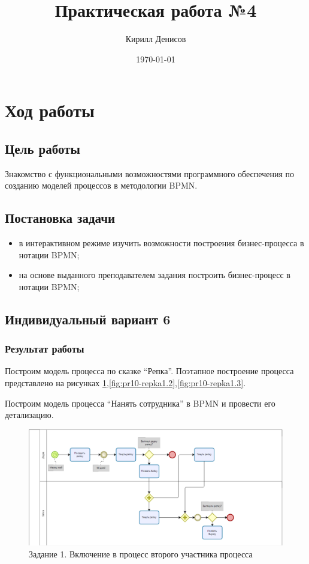 \documentclass[a4paper,14pt]{extarticle}
\author{Кирилл Денисов}
\title{Практическая работа №4}
\date{\today}
\newcommand{\pathToCommonFolder}{/home/denilai/Documents/repos/latex/Common}
\begin{document}
	\thispagestyle{empty}
	
	\newpage
	\newpage
\section{Ход работы}

\subsection*{Цель работы}
Знакомство с функциональными возможностями программного
обеспечения по созданию моделей процессов в методологии BPMN.

\subsection*{Постановка задачи}
\begin{itemize}
	\item в интерактивном режиме изучить возможности построения бизнес-процесса в нотации BPMN;
	\item на основе выданного преподавателем задания построить бизнес-процесс в нотации BPMN;
\end{itemize}



\subsection*{Индивидуальный вариант 6}

\subsubsection*{Результат работы}
\begin{problem}
	Построим модель процесса по сказке “Репка”. Поэтапное построение процесса представлено на рисунках \ref{fig:pr10-repka1.1},\ref{fig:pr10-repka1.2},\ref{fig:pr10-repka1.3}.
\end{problem}

\begin{problem}
	Построим модель процесса “Нанять сотрудника” в BPMN и провести его детализацию.
\end{problem}
	
	\begin{figure}[htpb]
		\centering
		\includegraphics[width=0.8\linewidth]{images/pr10-repka1.1}
		\caption{Задание 1. Включение в процесс второго участника процесса}
		\label{fig:pr10-repka1.1}
	\end{figure}
\end{document}
